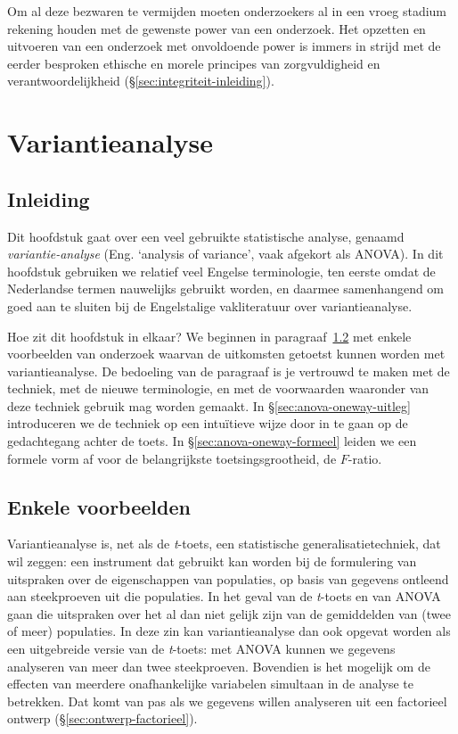 \documentclass[
]{book}
\begin{document}
Om al deze bezwaren te vermijden moeten onderzoekers al in een vroeg
stadium rekening houden met de gewenste power van een onderzoek. Het
opzetten en uitvoeren van een onderzoek met onvoldoende power is immers
in strijd met de eerder besproken ethische en morele principes van
zorgvuldigheid en verantwoordelijkheid
(§\ref{sec:integriteit-inleiding}).

\chapter{Variantieanalyse}\label{ch-variantieanalyse}

\section{Inleiding}\label{sec:inleiding}

Dit hoofdstuk gaat over een veel gebruikte statistische analyse, genaamd
\emph{variantie-analyse} (Eng. `analysis of variance', vaak afgekort als
ANOVA). In dit hoofdstuk gebruiken we relatief veel Engelse
terminologie, ten eerste omdat de Nederlandse termen nauwelijks gebruikt
worden, en daarmee samenhangend om goed aan te sluiten bij de
Engelstalige vakliteratuur over variantieanalyse.

Hoe zit dit hoofdstuk in elkaar? We beginnen in
paragraaf~\ref{sec:anova-voorbeelden} met enkele voorbeelden van onderzoek
waarvan de uitkomsten getoetst kunnen worden met variantieanalyse. De
bedoeling van de paragraaf is je vertrouwd te maken met de techniek, met
de nieuwe terminologie, en met de voorwaarden waaronder van deze
techniek gebruik mag worden gemaakt. In
§\ref{sec:anova-oneway-uitleg} introduceren we de techniek op een
intuïtieve wijze door in te gaan op de gedachtegang achter de toets. In
§\ref{sec:anova-oneway-formeel} leiden we een formele vorm af voor
de belangrijkste toetsingsgrootheid, de \(F\)-ratio.

\section{Enkele voorbeelden}\label{sec:anova-voorbeelden}

Variantieanalyse is, net als de \emph{t}-toets, een statistische
generalisatietechniek, dat wil zeggen: een instrument dat gebruikt kan
worden bij de formulering van uitspraken over de eigenschappen van
populaties, op basis van gegevens ontleend aan steekproeven uit die
populaties. In het geval van de \emph{t}-toets en van ANOVA gaan die uitspraken over het al dan niet gelijk zijn van de gemiddelden van (twee of meer)
populaties. In deze zin kan variantieanalyse dan ook opgevat worden als
een uitgebreide versie van de \emph{t}-toets: met ANOVA kunnen we gegevens analyseren van meer dan twee steekproeven.
Bovendien is het mogelijk om de effecten
van meerdere onafhankelijke variabelen simultaan in de analyse te
betrekken. Dat komt van pas als we gegevens willen analyseren uit een
factorieel ontwerp (§\ref{sec:ontwerp-factorieel}).
\end{document}
